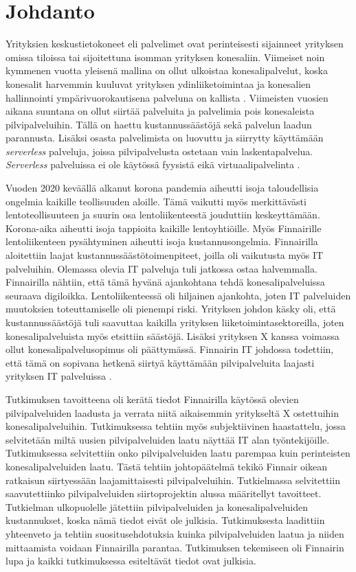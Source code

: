 \chapter{Johdanto\label{johdanto}}
Yrityksien keskustietokoneet eli palvelimet ovat perinteisesti sijainneet yrityksen omissa tiloissa tai sijoitettuna isomman yrityksen konesaliin. Viimeiset noin kymmenen vuotta yleisenä mallina on ollut ulkoistaa konesalipalvelut, koska konesalit harvemmin kuuluvat yrityksen ydinliiketoimintaa ja konesalien hallinnointi ympärivuorokautisena palveluna on kallista \citep{data_center_outsourcing}. Viimeisten vuosien aikana suuntana on ollut siirtää palveluita ja palvelimia pois konesaleista pilvipalveluihin. Tällä on haettu kustannussäästöjä sekä palvelun laadun parannusta. Lisäksi osasta palvelimista on luovuttu ja siirrytty käyttämään \emph{serverless} palveluja, joissa pilvipalvelusta ostetaan vain laskentapalvelua. \emph{Serverless} palveluissa ei ole käytössä fyysistä eikä virtuaalipalvelinta \citep{serverless_computing}.


Vuoden 2020 keväällä alkanut korona pandemia aiheutti isoja taloudellisia ongelmia kaikille teollisuuden aloille. Tämä vaikutti myös merkittävästi lentoteollisuuteen ja suurin osa lentoliikenteestä jouduttiin keskeyttämään. Korona-aika aiheutti isoja tappioita kaikille lentoyhtiöille. Myös Finnairille lentoliikenteen pysähtyminen aiheutti isoja kustannusongelmia. Finnairilla aloitettiin laajat kustannussäästötoimenpiteet, joilla oli vaikutusta myös IT palveluihin. Olemassa olevia IT palveluja tuli jatkossa ostaa halvemmalla. Finnairilla nähtiin, että tämä hyvänä ajankohtana tehdä konesalipalveluissa seuraava digiloikka. Lentoliikenteessä oli hiljainen ajankohta, joten IT palveluiden muutoksien toteuttamiselle oli pienempi riski. Yrityksen johdon käsky oli, että kustannussäästöjä tuli saavuttaa kaikilla yrityksen liiketoimintasektoreilla, joten konesalipalveluista myös etsittiin säästöjä. Lisäksi yrityksen X kanssa voimassa ollut konesalipalvelusopimus oli päättymässä. Finnairin IT johdossa todettiin, että tämä on sopivana hetkenä siirtyä käyttämään pilvipalveluita laajasti yrityksen IT palveluissa \citep{finnair_use_ibm}.

Tutkimuksen tavoitteena oli kerätä tiedot Finnairilla käytössä olevien pilvipalveluiden laadusta ja verrata niitä aikaisemmin yritykseltä X ostettuihin konesalipalveluihin. Tutkimuksessa tehtiin myös subjektiivinen haastattelu, jossa selvitetään miltä uusien pilvipalveluiden laatu näyttää IT alan työntekijöille. Tutkimuksessa selvitettiin onko pilvipalveluiden laatu parempaa kuin perinteisten konesalipalveluiden laatu. Tästä tehtiin johtopäätelmä tekikö Finnair oikean ratkaisun siirtyessään laajamittaisesti pilvipalveluihin. Tutkielmassa selvitettiin saavutettiinko pilvipalveluiden siirtoprojektin alussa määritellyt tavoitteet. Tutkielman ulkopuolelle jätettiin pilvipalveluiden ja konesalipalveluiden kustannukset, koska nämä tiedot eivät ole julkisia. Tutkimuksesta laadittiin yhteenveto ja tehtiin suositusehdotuksia kuinka pilvipalveluiden laatua ja niiden mittaamista voidaan Finnairilla parantaa. Tutkimuksen tekemiseen oli Finnairin lupa ja kaikki tutkimuksessa esiteltävät tiedot ovat julkisia.

